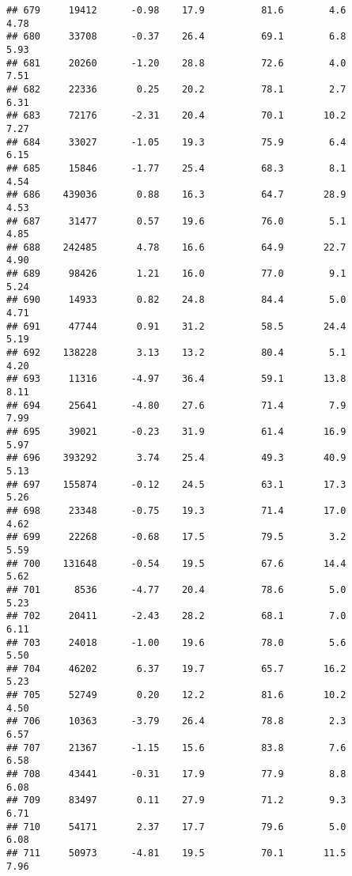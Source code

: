 \documentclass[
]{article}
\begin{document}
\begin{verbatim}
## 679     19412      -0.98    17.9          81.6        4.6              4.78
## 680     33708      -0.37    26.4          69.1        6.8              5.93
## 681     20260      -1.20    28.8          72.6        4.0              7.51
## 682     22336       0.25    20.2          78.1        2.7              6.31
## 683     72176      -2.31    20.4          70.1       10.2              7.27
## 684     33027      -1.05    19.3          75.9        6.4              6.15
## 685     15846      -1.77    25.4          68.3        8.1              4.54
## 686    439036       0.88    16.3          64.7       28.9              4.53
## 687     31477       0.57    19.6          76.0        5.1              4.85
## 688    242485       4.78    16.6          64.9       22.7              4.90
## 689     98426       1.21    16.0          77.0        9.1              5.24
## 690     14933       0.82    24.8          84.4        5.0              4.71
## 691     47744       0.91    31.2          58.5       24.4              5.19
## 692    138228       3.13    13.2          80.4        5.1              4.20
## 693     11316      -4.97    36.4          59.1       13.8              8.11
## 694     25641      -4.80    27.6          71.4        7.9              7.99
## 695     39021      -0.23    31.9          61.4       16.9              5.97
## 696    393292       3.74    25.4          49.3       40.9              5.13
## 697    155874      -0.12    24.5          63.1       17.3              5.26
## 698     23348      -0.75    19.3          71.4       17.0              4.62
## 699     22268      -0.68    17.5          79.5        3.2              5.59
## 700    131648      -0.54    19.5          67.6       14.4              5.62
## 701      8536      -4.77    20.4          78.6        5.0              5.23
## 702     20411      -2.43    28.2          68.1        7.0              6.11
## 703     24018      -1.00    19.6          78.0        5.6              5.50
## 704     46202       6.37    19.7          65.7       16.2              5.23
## 705     52749       0.20    12.2          81.6       10.2              4.50
## 706     10363      -3.79    26.4          78.8        2.3              6.57
## 707     21367      -1.15    15.6          83.8        7.6              6.58
## 708     43441      -0.31    17.9          77.9        8.8              6.08
## 709     83497       0.11    27.9          71.2        9.3              6.71
## 710     54171       2.37    17.7          79.6        5.0              6.08
## 711     50973      -4.81    19.5          70.1       11.5              7.96

\end{verbatim}
\end{document}
